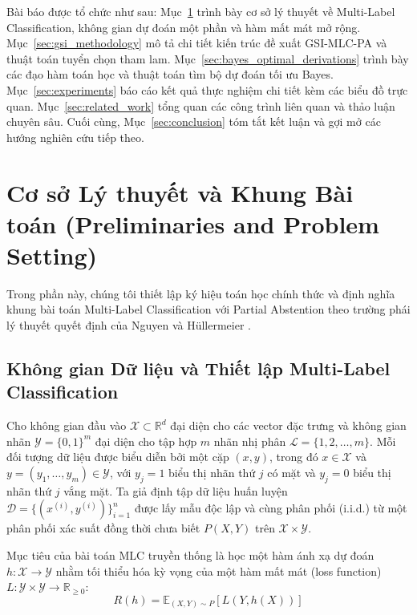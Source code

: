 \documentclass[11pt,a4paper]{article}
\begin{document}
Bài báo được tổ chức như sau: Mục~\ref{sec:preliminaries} trình bày cơ sở lý thuyết về Multi-Label Classification, không gian dự đoán một phần và hàm mất mát mở rộng. Mục~\ref{sec:gsi_methodology} mô tả chi tiết kiến trúc đề xuất GSI-MLC-PA và thuật toán tuyển chọn tham lam. Mục~\ref{sec:bayes_optimal_derivations} trình bày các đạo hàm toán học và thuật toán tìm bộ dự đoán tối ưu Bayes. Mục~\ref{sec:experiments} báo cáo kết quả thực nghiệm chi tiết kèm các biểu đồ trực quan. Mục~\ref{sec:related_work} tổng quan các công trình liên quan và thảo luận chuyên sâu. Cuối cùng, Mục~\ref{sec:conclusion} tóm tắt kết luận và gợi mở các hướng nghiên cứu tiếp theo.

\newpage
\section{Cơ sở Lý thuyết và Khung Bài toán (Preliminaries and Problem Setting)}
\label{sec:preliminaries}

Trong phần này, chúng tôi thiết lập ký hiệu toán học chính thức và định nghĩa khung bài toán Multi-Label Classification với Partial Abstention theo trường phái lý thuyết quyết định của Nguyen và H\"ullermeier \cite{nguyen2021multilabel}.

\subsection{Không gian Dữ liệu và Thiết lập Multi-Label Classification}
Cho không gian đầu vào $\mathcal{X} \subset \mathbb{R}^d$ đại diện cho các vector đặc trưng và không gian nhãn $\mathcal{Y} = \{0, 1\}^m$ đại diện cho tập hợp $m$ nhãn nhị phân $\mathcal{L} = \{1, 2, \dots, m\}$. Mỗi đối tượng dữ liệu được biểu diễn bởi một cặp $(x, y)$, trong đó $x \in \mathcal{X}$ và $y = (y_1, \dots, y_m) \in \mathcal{Y}$, với $y_j = 1$ biểu thị nhãn thứ $j$ có mặt và $y_j = 0$ biểu thị nhãn thứ $j$ vắng mặt. Ta giả định tập dữ liệu huấn luyện $\mathcal{D} = \{(x^{(i)}, y^{(i)})\}_{i=1}^n$ được lấy mẫu độc lập và cùng phân phối (i.i.d.) từ một phân phối xác suất đồng thời chưa biết $P(X, Y)$ trên $\mathcal{X} \times \mathcal{Y}$.

Mục tiêu của bài toán MLC truyền thống là học một hàm ánh xạ dự đoán $h: \mathcal{X} \to \mathcal{Y}$ nhằm tối thiểu hóa kỳ vọng của một hàm mất mát (loss function) $L: \mathcal{Y} \times \mathcal{Y} \to \mathbb{R}_{\ge 0}$:
\begin{equation}
R(h) = \mathbb{E}_{(X, Y) \sim P}[L(Y, h(X))]
\end{equation}
\end{document}
